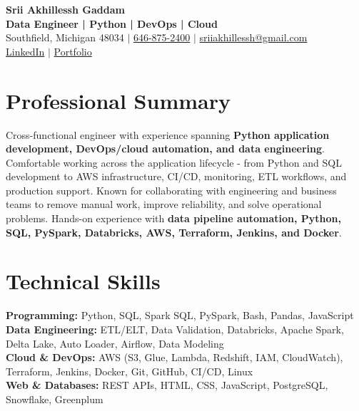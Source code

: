 \documentclass[letterpaper,10pt]{article}
\begin{document}
\fontsize{9.35pt}{10.45pt}\selectfont

\begin{center}
    {\LARGE \textbf{Srii Akhillessh Gaddam}} \\[-1pt]
    \textbf{Data Engineer | Python | DevOps | Cloud} \\[2pt]
    Southfield, Michigan 48034 $|$
    \href{tel:6468752400}{646-875-2400} $|$
    \href{mailto:sriiakhillessh@gmail.com}{sriiakhillessh@gmail.com} \\[1pt]
    \href{https://www.linkedin.com/in/srii-akhiilessh-gaddam-b48668191/}{LinkedIn} $|$
    \href{https://sriiakhillesshg.github.io/portfolio/}{Portfolio}
\end{center}
\vspace{-8pt}

\section{Professional Summary}
\small{Cross-functional engineer with experience spanning \textbf{Python application development, DevOps/cloud automation, and data engineering}. Comfortable working across the application lifecycle - from Python and SQL development to AWS infrastructure, CI/CD, monitoring, ETL workflows, and production support. Known for collaborating with engineering and business teams to remove manual work, improve reliability, and solve operational problems. Hands-on experience with \textbf{data pipeline automation, Python, SQL, PySpark, Databricks, AWS, Terraform, Jenkins, and Docker}.}

\section{Technical Skills}
\small{
\textbf{Programming:} Python, SQL, Spark SQL, PySpark, Bash, Pandas, JavaScript \\
\textbf{Data Engineering:} ETL/ELT, Data Validation, Databricks, Apache Spark, Delta Lake, Auto Loader, Airflow, Data Modeling \\
\textbf{Cloud \& DevOps:} AWS (S3, Glue, Lambda, Redshift, IAM, CloudWatch), Terraform, Jenkins, Docker, Git, GitHub, CI/CD, Linux \\
\textbf{Web \& Databases:} REST APIs, HTML, CSS, JavaScript, PostgreSQL, Snowflake, Greenplum
}

\end{document}
